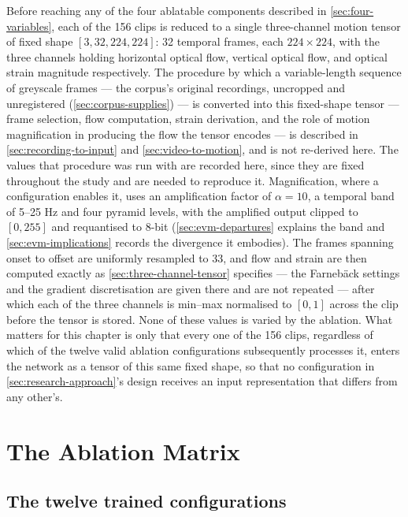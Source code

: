 Before reaching any of the four ablatable components described in \autoref{sec:four-variables}, each of the 156 clips is reduced to a single three-channel motion tensor of fixed shape $[3, 32, 224, 224]$: 32 temporal frames, each $224 \times 224$, with the three channels holding horizontal optical flow, vertical optical flow, and optical strain magnitude respectively. The procedure by which a variable-length sequence of greyscale frames --- the corpus's original recordings, uncropped and unregistered (\autoref{sec:corpus-supplies}) --- is converted into this fixed-shape tensor --- frame selection, flow computation, strain derivation, and the role of motion magnification in producing the flow the tensor encodes --- is described in \autoref{sec:recording-to-input} and \autoref{sec:video-to-motion}, and is not re-derived here. The values that procedure was run with are recorded here, since they are fixed throughout the study and are needed to reproduce it. Magnification, where a configuration enables it, uses an amplification factor of $\alpha = 10$, a temporal band of 5--25 Hz and four pyramid levels, with the amplified output clipped to $[0,255]$ and requantised to 8-bit (\autoref{sec:evm-departures} explains the band and \autoref{sec:evm-implications} records the divergence it embodies). The frames spanning onset to offset are uniformly resampled to 33, and flow and strain are then computed exactly as \autoref{sec:three-channel-tensor} specifies --- the Farneb\"ack settings and the gradient discretisation are given there and are not repeated --- after which each of the three channels is min--max normalised to $[0,1]$ across the clip before the tensor is stored. None of these values is varied by the ablation. What matters for this chapter is only that every one of the 156 clips, regardless of which of the twelve valid ablation configurations subsequently processes it, enters the network as a tensor of this same fixed shape, so that no configuration in \autoref{sec:research-approach}'s design receives an input representation that differs from any other's.


\section{The Ablation Matrix}
\label{sec:ablation-matrix}

\subsection{The twelve trained configurations}
\label{sec:twelve-trained}

